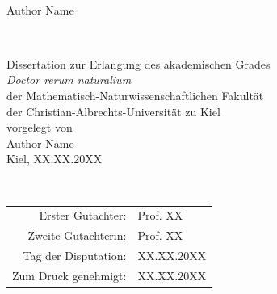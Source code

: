 \documentclass[12pt, openany]{book}
\title{\MYTITLE}
\def\MYAUTHOR{Author Name}
\begin{document}
\thispagestyle{empty}
\begin{center}
\begin{LARGE}
\vspace*{1.2em}
{\huge\textbf{\textcolor{clrt1}{\thetitle}}}\\
\vspace*{.1\paperheight}
\MYAUTHOR
\end{LARGE}
\end{center}
\vfill

\blankpage

\newpage
\thispagestyle{empty}


\begin{center}
\begin{LARGE}
\vspace*{1.2em}
\textbf{\thetitle}\\
\end{LARGE}
\vfill
Dissertation
zur Erlangung des akademischen Grades\\\vspace*{2em}
\textit{Doctor rerum naturalium}\\\vspace*{2em}
der Mathematisch-Naturwissenschaftlichen Fakultät\\
der Christian-Albrechts-Universität zu Kiel\\\vspace*{2em}
vorgelegt von\\
\MYAUTHOR\\\vspace*{2em}
Kiel, XX.XX.20XX
\end{center}

\blankpage
\thispagestyle{empty}
~\vfill

\hfill\begin{tabular}{rl}
    Erster Gutachter: & Prof. XX \\
    Zweite Gutachterin: & Prof. XX \\
    Tag der Disputation: & XX.XX.20XX\\
    Zum Druck genehmigt: & XX.XX.20XX
\end{tabular}{}

\blankpage
\newpage
\renewcommand{\chaptername}{}
\setcounter{page}{1}
\tableofcontents
\end{document}
